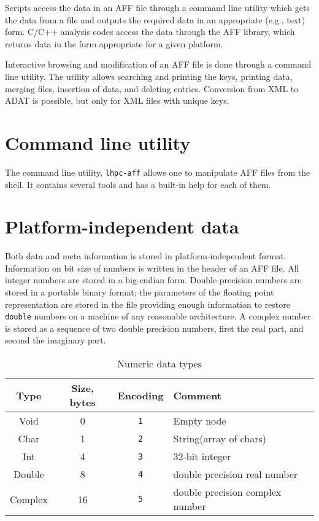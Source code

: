 \documentclass[10pt,letterpaper]{article}
\newcommand{\bc}{\begin{center}}
\newcommand{\ec}{\end{center}}
\newcommand{\ctext}[1]{\texttt{#1}}         %
\newcommand{\libname}[1]{\ctext{#1}\index{\ctext{#1}}} %
\newcommand{\ctype}[1]{\ctext{#1}}          %
\begin{document}
Scripts access the data in an AFF file through a command line utility
which gets the data from a file and outputs the required data in an
appropriate (e.g., text) form. C/C++ analysis codes access the data
through the AFF library, which returns data in the form
appropriate for a given platform.

Interactive browsing and modification of an AFF file is done through a
command line utility.  The utility allows searching and printing the
keys, printing data, merging files, insertion of data, and deleting
entries. Conversion from XML to ADAT is possible, but only for XML
files with unique keys.

\section{Command line utility}
The command line utility, \libname{lhpc-aff} allows one to manipulate
AFF files from the shell. It contains several tools and has a built-in
help for each of them.

\section{Platform-independent data}
Both data and meta information is stored in platform-independent
format.  Information on bit size of numbers is written in the header
of an AFF file.  All integer numbers are stored in a big-endian form.
Double precision numbers are stored in a portable binary format; the
parameters of the floating point representation are stored in the file
providing enough information to restore \ctype{double} numbers on a
machine of any reasonable architecture.  A complex number is stored as
a sequence of two double precision numbers, first the real part, and
second the imaginary part.

\begin{table}[ht]
\bc
\caption{Numeric data types}\label{tab:types}
\begin{tabular}{|c|c|c|l|} \hline
Type & Size, bytes & Encoding & Comment \\ \hline
Void & 0 & \ctext{1}& Empty node \\
Char & 1 & \ctext{2}& String(array of chars) \\
Int   & 4 & \ctext{3}& 32-bit integer \\
Double & 8 & \ctext{4}& double precision real number \\
Complex & 16 & \ctext{5}& double precision complex number \\ \hline
\end{tabular}
\ec
\end{table}
\end{document}
